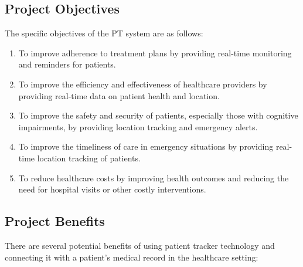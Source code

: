 \documentclass[12pt]{article}
\begin{document}
		\subsection{Project Objectives}
		The specific objectives of the PT system are as follows:
		\begin{enumerate}
			\item To improve adherence to treatment plans by providing real-time monitoring and reminders for patients.
			\item To improve the efficiency and effectiveness of healthcare providers by providing real-time data on patient health and location.
			\item To improve the safety and security of patients, especially those with cognitive impairments, by providing location tracking and emergency alerts.
			\item To improve the timeliness of care in emergency situations by providing real-time location tracking of patients.
			\item To reduce healthcare costs by improving health outcomes and reducing the need for hospital visits or other costly interventions.
		
		\end{enumerate}
		\subsection{Project Benefits}
			There are several potential benefits of using patient tracker technology and connecting it with a patient's medical record in the healthcare setting:
			
\end{document}
